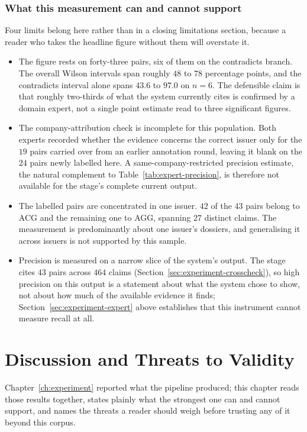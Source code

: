 \documentclass[fontsize=12pt,oneside,headings=small]{scrreprt}
\begin{document}
\subsection{What this measurement can and cannot support}

Four limits belong here rather than in a closing limitations section, because a reader who takes the headline figure without them will overstate it.

\begin{itemize}
  \item The figure rests on forty-three pairs, six of them on the \textsf{contradicts} branch. The overall Wilson intervals span roughly $48$ to $78$ percentage points, and the \textsf{contradicts} interval alone spans $43.6$ to $97.0$ on $n=6$. The defensible claim is that roughly two-thirds of what the system currently cites is confirmed by a domain expert, not a single point estimate read to three significant figures.
  \item The company-attribution check is incomplete for this population. Both experts recorded whether the evidence concerns the correct issuer only for the $19$ pairs carried over from an earlier annotation round, leaving it blank on the $24$ pairs newly labelled here. A same-company-restricted precision estimate, the natural complement to Table~\ref{tab:expert-precision}, is therefore not available for the stage's complete current output.
  \item The labelled pairs are concentrated in one issuer. $42$ of the $43$ pairs belong to ACG and the remaining one to AGG, spanning $27$ distinct claims. The measurement is predominantly about one issuer's dossiers, and generalising it across issuers is not supported by this sample.
  \item Precision is measured on a narrow slice of the system's output. The stage cites $43$ pairs across $464$ claims (Section~\ref{sec:experiment-crosscheck}), so high precision on this output is a statement about what the system chose to show, not about how much of the available evidence it finds; Section~\ref{sec:experiment-expert} above establishes that this instrument cannot measure recall at all.
\end{itemize}

\chapter{Discussion and Threats to Validity}
\label{ch:discussion}

Chapter~\ref{ch:experiment} reported what the pipeline produced; this chapter reads those results together, states plainly what the strongest one can and cannot support, and names the threats a reader should weigh before trusting any of it beyond this corpus.
\end{document}
